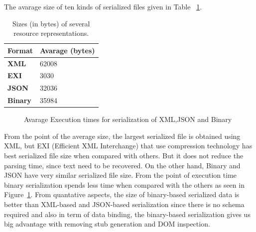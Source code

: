 The avarage size of ten kinds of serialized files given in Table ~\ref{tab:binaryyy}.
\begin{table}
\centering
\begin{tabular}{ p{5.50cm} p{5.50cm} }
\toprule
\multicolumn{1}{l}{\textbf{Format}} & \textbf{Avarage (bytes)}\\
\midrule
\textbf{XML}    & 62008\\
\rowcolor{Gray}
\textbf{EXI}    & 3030\\
\textbf{JSON}   & 32036\\
\rowcolor{Gray}
\textbf{Binary} & 35984\\

\bottomrule
\end{tabular}
\caption[Sizes (in bytes) of several resource representations.]{Sizes (in bytes) of several resource representations.}
\label{tab:binaryyy}
\end{table}
\begin{figure}
\caption{Avarage Execution times for serialization of XML,JSON and Binary}
\label{fig:executiontime}
\end{figure}

From the point of the average size, the largest serialized file is obtained using XML, but EXI (Efficient XML Interchange) that use compression technology has best serialized file size when compared with others. But it does not reduce the parsing time, since text need to be recovered. On the other hand, Binary and JSON have very similar serialized file size. From the point of execution time binary serialization spends less time when compared with the others as seen in Figure~\ref{fig:executiontime}. From quantative aspects, the size of binary-based serialized data is better than XML-based and JSON-based serialization since there is no schema required and also in term of data binding, the binary-based serialization gives us big advantage with removing stub generation and DOM inspection.

